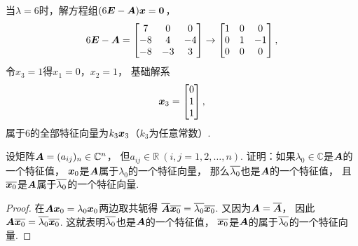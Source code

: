 \begin{example}
\begin{solution}
当\(\lambda=6\)时，解方程组\((6\boldsymbol{E}-\boldsymbol{A})\boldsymbol{x}=\boldsymbol0\)，\[
	6\boldsymbol{E}-\boldsymbol{A}
	= \begin{bmatrix} 7 & 0 & 0 \\ -8 & 4 & -4 \\ -8 & -3 & 3 \end{bmatrix}
	\to \begin{bmatrix} 1 & 0 & 0 \\ 0 & 1 & -1 \\ 0 & 0 & 0 \end{bmatrix},
\]
令\(x_3=1\)得\(x_1=0\)，\(x_2=1\)，
基础解系\[
	\boldsymbol{x}_3 = \begin{bmatrix} 0 \\ 1 \\ 1 \end{bmatrix},
\]
属于\(6\)的全部特征向量为\(k_3\boldsymbol{x}_3\)（\(k_3\)为任意常数）.
\end{solution}
\end{example}

\begin{example}
设矩阵\(\boldsymbol{A} = (a_{ij})_n \in \mathbb{C}^n\)，
但\(a_{ij} \in \mathbb{R}\ (i,j=1,2,\dotsc,n)\).
证明：如果\(\lambda_0\in\mathbb{C}\)是\(\boldsymbol{A}\)的一个特征值，
\(\boldsymbol{x}_0\)是\(\boldsymbol{A}\)属于\(\lambda_0\)的一个特征向量，
那么\(\overline{\lambda_0}\)也是\(\boldsymbol{A}\)的一个特征值，
且\(\overline{\boldsymbol{x}_0}\)是\(\boldsymbol{A}\)属于\(\overline{\lambda_0}\)的一个特征向量.
\begin{proof}
在\(\boldsymbol{A}\boldsymbol{x}_0=\lambda_0\boldsymbol{x}_0\)两边取共轭得
\(\overline{\boldsymbol{A}}\overline{\boldsymbol{x}_0}
=\overline{\lambda_0}\overline{\boldsymbol{x}_0}\).
又因为\(\boldsymbol{A}=\overline{\boldsymbol{A}}\)，
因此\(\boldsymbol{A}\overline{\boldsymbol{x}_0}=\overline{\lambda_0}\overline{\boldsymbol{x}_0}\).
这就表明\(\overline{\lambda_0}\)也是\(\boldsymbol{A}\)的一个特征值，
\(\overline{\boldsymbol{x}_0}\)是\(\boldsymbol{A}\)的属于\(\overline{\lambda_0}\)的一个特征向量.
\end{proof}
\end{example}


